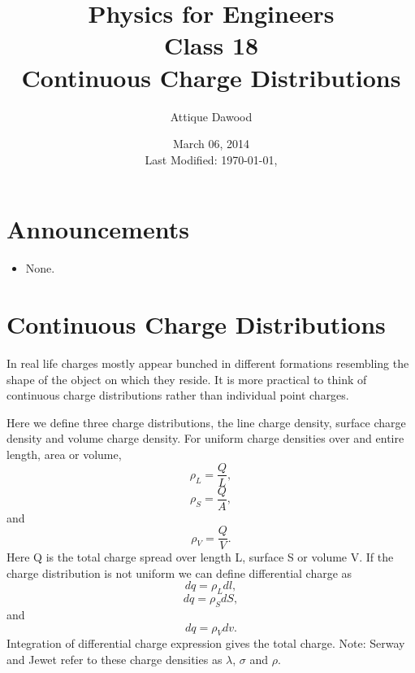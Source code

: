 \documentclass[12pt,a4paper]{article}
\title{\vspace{-2cm}Physics for Engineers\\Class 18\\Continuous Charge Distributions}
\author{Attique Dawood}
\date{March 06, 2014\\[0.2cm] Last Modified: \today, \currenttime}
\begin{document}
\maketitle
\section{Announcements}
\begin{itemize}
\item None.
\end{itemize}
\section{Continuous Charge Distributions}
In real life charges mostly appear bunched in different formations resembling the shape of the object on which they reside. It is more practical to think of continuous charge distributions rather than individual point charges.

Here we define three charge distributions, the line charge density, surface charge density and volume charge density. For uniform charge densities over and entire length, area or volume,
\begin{equation}
\rho_L=\dfrac{Q}{L},
\end{equation}
\begin{equation}
\rho_S=\dfrac{Q}{A},
\end{equation}
and
\begin{equation}
\rho_V=\dfrac{Q}{V}.
\end{equation}
Here Q is the total charge spread over length L, surface S or volume V. If the charge distribution is not uniform we can define differential charge as
\begin{equation}
dq=\rho_Ldl,
\end{equation}
\begin{equation}
dq=\rho_SdS,
\end{equation}
and
\begin{equation}
dq=\rho_Vdv.
\end{equation}
Integration of differential charge expression gives the total charge.
Note: Serway and Jewet \cite{Serway} refer to these charge densities as $\lambda$, $\sigma$ and $\rho$.
\end{document}

